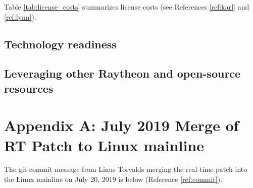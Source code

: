 \documentclass[12pt]{article}
\begin{document}
Table \ref{tab:license_costs} summarizes license costs (see References
\ref{ref:karl} and \ref{ref:lynn}).

\begin{table}[H]
\captionsetup{width=.9\linewidth}
\caption{License costs}
\label{tab:license_costs}
\end{table}

\subsection{Technology readiness}

\subsection{Leveraging other Raytheon and open-source resources}


%
\newpage
\section{Appendix A: July 2019 Merge of RT Patch to Linux mainline}

The git commit message from Linus Torvalds merging the real-time patch
into the Linux mainline on July 20, 2019 is below (Reference \ref{ref:commit}).
\end{document}
